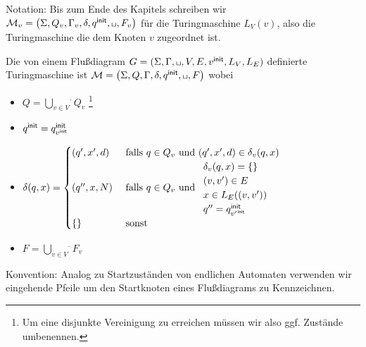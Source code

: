 Notation: Bis zum Ende des Kapitels schreiben wir
$\M_v=\left(\Sigma,Q_v,\Gamma_v,\delta,\qinit,\blank,F_v\right)$
für die Turingmaschine $L_V(v)$, also die Turingmaschine die dem Knoten $v$ zugeordnet ist.

\begin{Def}%
Die von einem Flußdiagram $G=(\Sigma, \Gamma, \blank,V,E,v^\mathsf{init},L_V,L_E)$ definierte Turingmaschine ist 
$\M=\left(\Sigma,Q,\Gamma,\delta,\qinit,\blank,F\right)$ wobei
\begin{itemize}
 \item $Q=\overset{.}{\bigcup\limits_{v\in V}} Q_v$ \footnote{Um eine disjunkte Vereinigung zu erreichen müssen wir also ggf. Zustände umbenennen.}
 \item $q^\mathsf{init} = q^\mathsf{init}_{v^\mathsf{init}}$
 \item $\delta(q,x) = 
 \begin{cases}
 (q',x',d) & \text{ falls } q\in Q_v \text{ und } (q',x',d)\in\delta_v(q,x)\\
 (q'',x,N) & \text{ falls } q\in Q_v \text{ und } 
      \begin{array}{l}
       \delta_v(q,x)=\{\}\\
       (v,v')\in E\\
       x\in L_E((v,v'))\\
       q''=q^\mathsf{init}_{{v'}^\mathsf{init}}\\
      \end{array}\\
 \{\} & \text{ sonst }\\
 \end{cases}$
 \item $F=\overset{.}{\bigcup\limits_{v\in V}} F_v$ \qedhere
\end{itemize}
\end{Def}

Konvention: Analog zu Startzuständen von endlichen Automaten verwenden wir eingehende Pfeile um den Startknoten eines Flußdiagrams zu Kennzeichnen.

